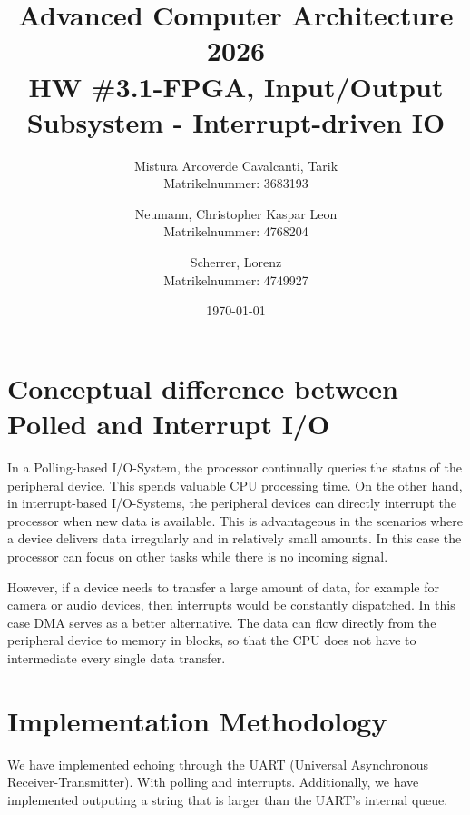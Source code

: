 \documentclass[11pt,a4paper]{article}
\title{Advanced Computer Architecture 2026 \\ 
\large HW \#3.1-FPGA, Input/Output Subsystem - Interrupt-driven IO}
\author{
  Mistura Arcoverde Cavalcanti, Tarik \\ \small Matrikelnummer: 3683193
  \and
  Neumann, Christopher Kaspar Leon \\ \small Matrikelnummer: 4768204
  \and
  Scherrer, Lorenz \\ \small Matrikelnummer: 4749927
}
\date{\today}
\begin{document}
\maketitle

\section{Conceptual difference between Polled and Interrupt I/O}

In a Polling-based I/O-System, the processor continually queries the status of the peripheral device. This spends valuable CPU processing time. On the other hand, in interrupt-based I/O-Systems, the peripheral devices can directly interrupt the processor when new data is available. This is advantageous in the scenarios where a device delivers data irregularly and in relatively small amounts. In this case the processor can focus on other tasks while there is no incoming signal.

However, if a device needs to transfer a large amount of data, for example for camera or audio devices, then interrupts would be constantly dispatched. In this case DMA serves as a better alternative. The data can flow directly from the peripheral device to memory in blocks, so that the CPU does not have to intermediate every single data transfer.




\section{Implementation Methodology}
% 
We have implemented echoing through the UART (Universal Asynchronous Receiver-Transmitter). With polling and interrupts. Additionally, we have implemented outputing a string that is larger than the UART's internal queue.
\end{document}
